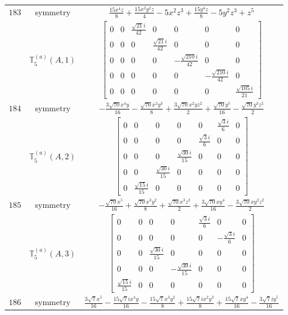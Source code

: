 \documentclass[fleqn,8pt,landscape]{jsarticle}
\begin{document}
\begin{longtable}{ccc}
$ 183 $ & $ \text{symmetry} $ & $ \frac{15 x^{4} z}{8} + \frac{15 x^{2} y^{2} z}{4} - 5 x^{2} z^{3} + \frac{15 y^{4} z}{8} - 5 y^{2} z^{3} + z^{5} $ \\
$  $ & $ \mathbb{T}_{5}^{(a)}(A,1) $ & $ \begin{bmatrix} 0 & 0 & \frac{\sqrt{21} i}{42} & 0 & 0 & 0 & 0 \\ 0 & 0 & 0 & \frac{\sqrt{21} i}{42} & 0 & 0 & 0 \\ 0 & 0 & 0 & 0 & - \frac{\sqrt{210} i}{42} & 0 & 0 \\ 0 & 0 & 0 & 0 & 0 & - \frac{\sqrt{210} i}{42} & 0 \\ 0 & 0 & 0 & 0 & 0 & 0 & \frac{\sqrt{105} i}{21} \end{bmatrix} $ \\ \hline
$ 184 $ & $ \text{symmetry} $ & $ - \frac{3 \sqrt{70} x^{4} y}{16} - \frac{\sqrt{70} x^{2} y^{3}}{8} + \frac{3 \sqrt{70} x^{2} y z^{2}}{2} + \frac{\sqrt{70} y^{5}}{16} - \frac{\sqrt{70} y^{3} z^{2}}{2} $ \\
$  $ & $ \mathbb{T}_{5}^{(a)}(A,2) $ & $ \begin{bmatrix} 0 & 0 & 0 & 0 & 0 & \frac{\sqrt{3} i}{6} & 0 \\ 0 & 0 & 0 & 0 & \frac{\sqrt{3} i}{6} & 0 & 0 \\ 0 & 0 & 0 & \frac{\sqrt{30} i}{15} & 0 & 0 & 0 \\ 0 & 0 & \frac{\sqrt{30} i}{15} & 0 & 0 & 0 & 0 \\ 0 & \frac{\sqrt{15} i}{15} & 0 & 0 & 0 & 0 & 0 \end{bmatrix} $ \\ \hline
$ 185 $ & $ \text{symmetry} $ & $ - \frac{\sqrt{70} x^{5}}{16} + \frac{\sqrt{70} x^{3} y^{2}}{8} + \frac{\sqrt{70} x^{3} z^{2}}{2} + \frac{3 \sqrt{70} x y^{4}}{16} - \frac{3 \sqrt{70} x y^{2} z^{2}}{2} $ \\
$  $ & $ \mathbb{T}_{5}^{(a)}(A,3) $ & $ \begin{bmatrix} 0 & 0 & 0 & 0 & \frac{\sqrt{3} i}{6} & 0 & 0 \\ 0 & 0 & 0 & 0 & 0 & - \frac{\sqrt{3} i}{6} & 0 \\ 0 & 0 & \frac{\sqrt{30} i}{15} & 0 & 0 & 0 & 0 \\ 0 & 0 & 0 & - \frac{\sqrt{30} i}{15} & 0 & 0 & 0 \\ \frac{\sqrt{15} i}{15} & 0 & 0 & 0 & 0 & 0 & 0 \end{bmatrix} $ \\ \hline
$ 186 $ & $ \text{symmetry} $ & $ \frac{3 \sqrt{7} x^{5}}{16} - \frac{15 \sqrt{7} i x^{4} y}{16} - \frac{15 \sqrt{7} x^{3} y^{2}}{8} + \frac{15 \sqrt{7} i x^{2} y^{3}}{8} + \frac{15 \sqrt{7} x y^{4}}{16} - \frac{3 \sqrt{7} i y^{5}}{16} $ \\

\end{longtable}
\end{document}
